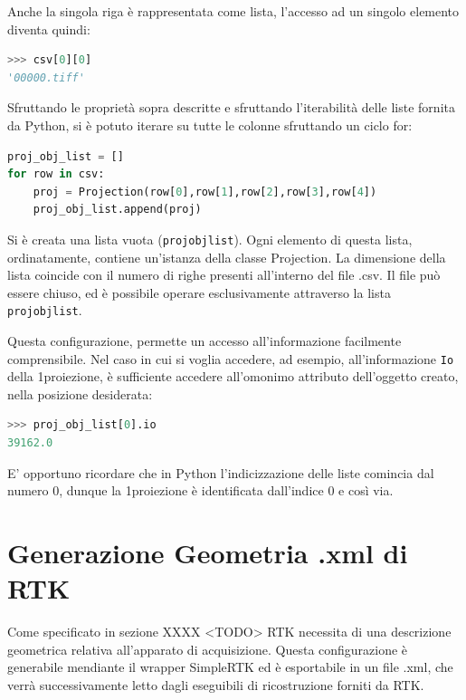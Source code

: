 \documentclass[a4paper,12pt, doubleside]{report}
\begin{document}
            Anche la singola riga è rappresentata come lista, l'accesso ad un singolo elemento diventa quindi:
            \begin{lstlisting}[language=python, frame=bt]
>>> csv[0][0]
'00000.tiff'
            \end{lstlisting}
            
            
            Sfruttando le proprietà sopra descritte e sfruttando l'iterabilità delle liste fornita da Python\cite{python-list}, si è potuto iterare su tutte le colonne sfruttando un ciclo for:
            
            \begin{lstlisting}[language=python, frame=bt]
proj_obj_list = []
for row in csv:
    proj = Projection(row[0],row[1],row[2],row[3],row[4])
    proj_obj_list.append(proj)
            \end{lstlisting}
            
            Si è creata una lista vuota (\texttt{proj\textunderscore obj\textunderscore list}). Ogni elemento di questa lista, ordinatamente, contiene un'istanza della classe Projection. La dimensione della lista coincide con il numero di righe presenti all'interno del file .csv. Il file può essere chiuso, ed è possibile operare esclusivamente attraverso la lista \texttt{proj\textunderscore obj\textunderscore list}.
            \bigskip
            \par
            Questa configurazione, permette un accesso all'informazione facilmente comprensibile. Nel caso in cui si voglia accedere, ad esempio,  all'informazione \texttt{Io} della 1\degree proiezione, è sufficiente accedere all'omonimo attributo dell'oggetto creato, nella posizione desiderata: 
            
            \begin{lstlisting}[language=python, frame=bt]
>>> proj_obj_list[0].io
39162.0
            \end{lstlisting}
            
            E' opportuno ricordare che in Python l'indicizzazione delle liste comincia dal numero 0, dunque la 1\degree proiezione è identificata dall'indice 0 e così via.
            
        \section{Generazione Geometria .xml di RTK}
            \par
                Come specificato in sezione XXXX <TODO> RTK necessita di una descrizione geometrica relativa all'apparato di acquisizione. Questa configurazione è generabile mendiante il wrapper SimpleRTK ed è esportabile in un file .xml, che verrà successivamente letto dagli eseguibili di ricostruzione forniti da RTK.
                
\end{document}
